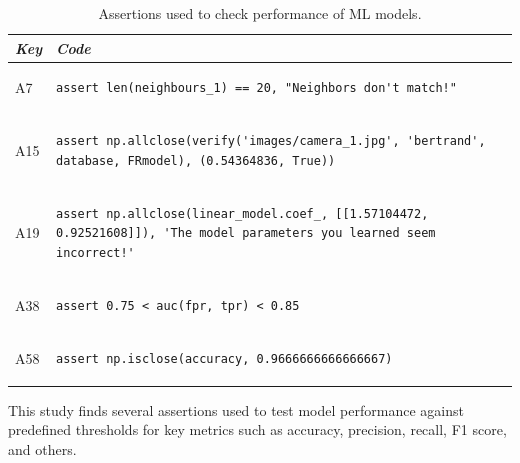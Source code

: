 \begin{table}
\centering
\begin{tabular}{@{}m{} m{}@{}}
\toprule
\emph{\textbf{Key}}&
\emph{\textbf{Code}}\\
\midrule

A7 &
\begin{lstlisting}
assert len(neighbours_1) == 20, "Neighbors don't match!"
\end{lstlisting}\\

A15 &
\begin{lstlisting}
assert np.allclose(verify('images/camera_1.jpg', 'bertrand', database, FRmodel), (0.54364836, True))
\end{lstlisting}\\

A19 &
\begin{lstlisting}
assert np.allclose(linear_model.coef_, [[1.57104472, 0.92521608]]), 'The model parameters you learned seem incorrect!'
\end{lstlisting}\\

A38 &
\begin{lstlisting}
assert 0.75 < auc(fpr, tpr) < 0.85
\end{lstlisting}\\

A58 &
\begin{lstlisting}
assert np.isclose(accuracy, 0.9666666666666667)
\end{lstlisting}\\
\end{tabular}
\caption{Assertions used to check performance of ML models.}
\label{tab:model-perf-explicit}
\end{table}

This study finds several assertions used to test model performance against predefined thresholds for key metrics such as accuracy, precision, recall, F1 score, and others.

